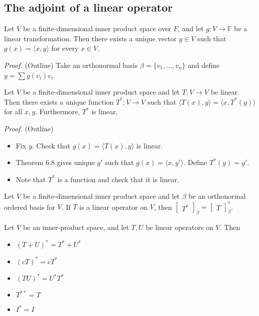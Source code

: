 \documentclass[12pt]{article}
\newenvironment{theorem}[2][Theorem]{\begin{trivlist}
\item[\hskip \labelsep {\bfseries #1}\hskip \labelsep {\bfseries #2.}]}{\end{trivlist}}
\begin{document}
\subsection{The adjoint of a linear operator}

\begin{theorem}{6.8}
Let $V$ be a finite-dimensional inner product space over $F$, and let $g : V \to \mathbb{F}$ be a linear transformation. Then there exists a unique vector $y \in V$ such that $g(x) = \langle x, y \rangle$ for every $x \in V$.
\end{theorem}

\textit{Proof.} (Outline) Take an orthonormal basis $\beta = \{v_1, \dots, v_n\}$ and define $y = \sum \overline{g(v_i)}v_i$.

\begin{theorem}{6.9}
Let $V$ be a finite-dimensional inner product space and let $T : V \to V$ be linear. Then there exists a unique function $T^* : V \to V$ such that $\langle T(x), y \rangle = \langle x, T^*(y) \rangle$ for all $x,y$. Furthermore, $T^*$ is linear.
\end{theorem}

\textit{Proof.} (Outline)

\begin{itemize}
    \item Fix $y$. Check that $g(x) = \langle T(x), y \rangle$ is linear.
    
    \item Theorem 6.8 gives unique $y'$ such that $g(x) = \langle x, y' \rangle$. Define $T^*(y) = y'$.
    
    \item Note that $T^*$ is a function and check that it is linear.
\end{itemize}

\begin{theorem}{6.10}
Let $V$ be a finite-dimensional inner product space and let $\beta$ be an orthonormal ordered basis for $V$. If $T$ is a linear operator on $V$, then $\begin{bmatrix}
T^*
\end{bmatrix}_\beta = \begin{bmatrix}
T
\end{bmatrix}_\beta^*$.
\end{theorem}

\begin{theorem}{6.11}
Let $V$ be an inner-product space, and let $T,U$ be linear operators on $V$. Then

\begin{itemize}
    \item[(a)] $(T + U)^* = T^* + U^*$
    
    \item[(b)] $(cT)^* = \overline{c}T^*$
    
    \item[(c)] $(TU)^* = U^*T^*$
    
    \item[(d)] $T^{**} = T$
    
    \item[(e)] $I^* = I$
\end{itemize}
\end{theorem}
\end{document}

